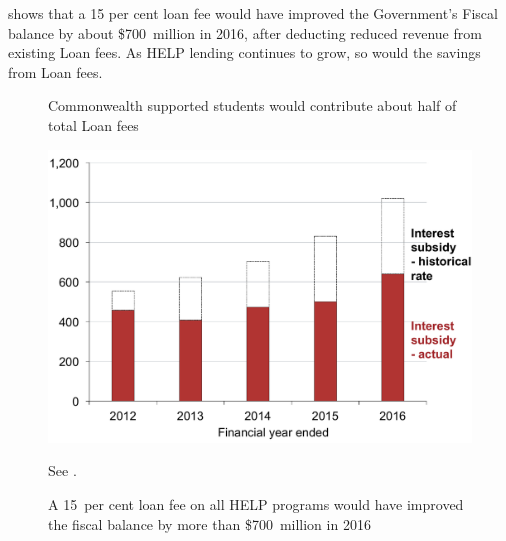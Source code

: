 \documentclass{grattan}
\begin{document}
 shows that a 15 per cent loan fee would have improved the Government's \gls{Fiscal balance} by about \$700~million in 2016, after deducting reduced revenue from existing \gls{Loan fees}.
As \gls{HELP} lending continues to grow, so would the savings from \gls{Loan fees}.


\begin{figure}
\begin{minipage}[t][\textheight]{\columnwidth}
\vspace{\grattanfptop}
\caption{Commonwealth supported students would contribute about half of total \gls{Loan fees}}\label{fig:fig23-Cth-supported-students-would-contr-half-tot-loan-fees}


\includegraphics[page=23]{atlas/Chartpack.pdf}

{See .}
\end{minipage}
\hfill 
\begin{minipage}[t][\textheight]{\columnwidth}
\vspace{\grattanfptop}
\caption{A 15~per cent loan fee on all \gls{HELP} programs would have improved the fiscal balance by more than \$700~million in 2016}\label{fig:fig24-a-15pc-loan-fee-all-HELP-progs-would-improve-fisc-bal-by-over-700M-in-2016}


\end{minipage}
\end{figure}
\end{document}
